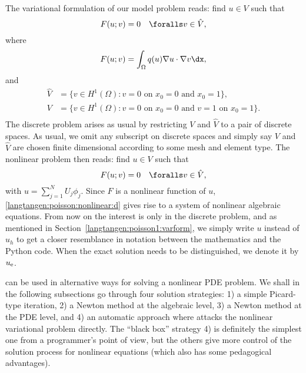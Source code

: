 The variational formulation of our model problem reads:
find $u \in V$ such that
\begin{equation} \label{langtangen:poisson:nonlinear1}
  F(u; v) = 0 \quad \foralls v \in \hat{V},
\end{equation}
where
\begin{equation}
\label{langtangen:poisson:nonlinear2}
F(u; v) = \int_\Omega q(u)\nabla u\cdot \nabla v\dx,
\end{equation}
and
\begin{equation}
  \begin{split}
    \hat{V} &= \{v \in H^1(\Omega) : v = 0 \mbox{ on } x_0=0\mbox{ and }x_0=1\}, \\
     V      &= \{v \in H^1(\Omega) : v = 0 \mbox{ on } x_0=0\mbox{ and } v = 1\mbox{ on }x_0=1\}. \\
  \end{split}
\end{equation}
The discrete problem arises as usual by restricting $V$ and $\hat V$
to a pair of discrete spaces. As usual, we omit any subscript on
discrete spaces and simply say $V$ and $\hat V$ are chosen finite
dimensional according to some mesh and element type.  The nonlinear
problem then reads: find $u\in V$ such that
\begin{equation}
  F(u; v) = 0 \quad \foralls v \in \hat{V},
\label{langtangen:poisson:nonlinear:d}
\end{equation}
with $u = \sum_{j=1}^N U_j \phi_j$. Since $F$ is a nonlinear function
of $u$, \eqref{langtangen:poisson:nonlinear:d} gives rise to a system
of nonlinear algebraic equations.  From now on the interest is only in
the discrete problem, and as mentioned in
Section~\ref{langtangen:poisson1:varform}, we simply write $u$ instead
of $u_h$ to get a closer resemblance in notation between the mathematics and the
Python code. When the exact solution needs to be distinguished, we
denote it by $u_{\rm e}$.

\fenics{} can be used in alternative ways for solving a nonlinear PDE
problem. We shall in the following subsections go through four
solution strategies:
1) a simple Picard-type iteration,
2) a Newton method at the algebraic level,
3) a Newton method at the PDE level, and
4) an automatic approach where \fenics{} attacks the nonlinear variational
problem directly. The ``black box'' strategy 4) is definitely the
simplest one from a
programmer's point of view, but the others give more control of the
solution process for nonlinear equations (which also has some
pedagogical advantages).


